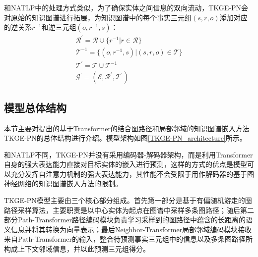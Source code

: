和NATLP中的处理方式类似，为了确保实体之间信息的双向流动，TKGE-PN会对原始的知识图谱进行拓展，为知识图谱中的每个事实三元组$(s,r,o)$添加对应的逆关系$r^{-1}$和逆三元组$(o,r^{-1},s)$：
\begin{gather}
    \mathcal{R}^{\prime}=\mathcal{R}\cup\{ r^{-1} | r\in \mathcal{R}\}\\
    \mathcal{T}^{-1}= \{ (o,r^{-1},s)| (s,r,o)\in \mathcal{T}\}\\
    \mathcal{T}^{\prime} = \mathcal{T}\cup\mathcal{T}^{-1}\\
    \mathcal{G}^\prime = (\mathcal{E}, \mathcal{R}^\prime, \mathcal{T}^\prime)
\end{gather}

\subsection{模型总体结构}

本节主要对提出的基于Transformer的结合图路径和局部邻域的知识图谱嵌入方法TKGE-PN的总体结构进行介绍。模型架构如图\ref{TKGE-PN_architecture}所示。

和NATLP不同，TKGE-PN并没有采用编码器-解码器架构，而是利用Transformer自身的强大表达能力直接对目标实体的嵌入进行预测，这样的方式的优点是模型可以充分发挥自注意力机制的强大表达能力，其性能不会受限于用作解码器的基于图神经网络的知识图谱嵌入方法的限制。

TKGE-PN模型主要由三个核心部分组成。首先第一部分是基于有偏随机游走的图路径采样算法，主要职责是以中心实体为起点在图谱中采样多条图路径；随后第二部分Path-Transformer路径编码模块负责学习采样到的图路径中蕴含的长距离的语义信息并将其转换为向量表示；最后Neighbor-Transformer局部邻域编码模块接收来自Path-Transformer的输入，整合待预测事实三元组中的信息以及多条图路径所构成上下文邻域信息，并以此预测三元组得分。

